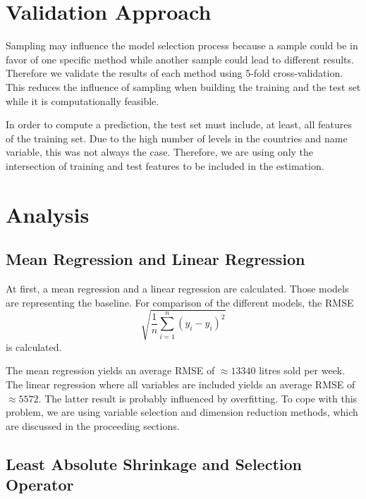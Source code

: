 \documentclass[11pt,]{article}
\begin{document}
\hypertarget{validation-approach}{%
\section{\texorpdfstring{Validation Approach
\label{chap:val}}{Validation Approach }}\label{validation-approach}}

Sampling may influence the model selection process because a sample
could be in favor of one specific method while another sample could lead
to different results. Therefore we validate the results of each method
using 5-fold cross-validation. This reduces the influence of sampling
when building the training and the test set while it is computationally
feasible.

In order to compute a prediction, the test set must include, at least,
all features of the training set. Due to the high number of levels in
the countries and name variable, this was not always the case.
Therefore, we are using only the intersection of training and test
features to be included in the estimation.

\hypertarget{analysis}{%
\section{\texorpdfstring{Analysis
\label{chap:anal}}{Analysis }}\label{analysis}}

\hypertarget{mean-regression-and-linear-regression}{%
\subsection{Mean Regression and Linear
Regression}\label{mean-regression-and-linear-regression}}

At first, a mean regression and a linear regression are calculated.
Those models are representing the baseline. For comparison of the
different models, the \ac{RMSE}
\[\sqrt{\frac{1}{n}\sum_{i = 1}^{n}\left(y_i-\hat{y}_i\right)^2}\] is
calculated.

The mean regression yields an average \ac{RMSE} of \(\approx 13340\)
litres sold per week. The linear regression where all variables are
included yields an average \ac{RMSE} of \(\approx 5572\). The latter
result is probably influenced by overfitting. To cope with this problem,
we are using variable selection and dimension reduction methods, which
are discussed in the proceeding sections.

\hypertarget{least-absolute-shrinkage-and-selection-operator}{%
\subsection{Least Absolute Shrinkage and Selection
Operator}\label{least-absolute-shrinkage-and-selection-operator}}
\end{document}
